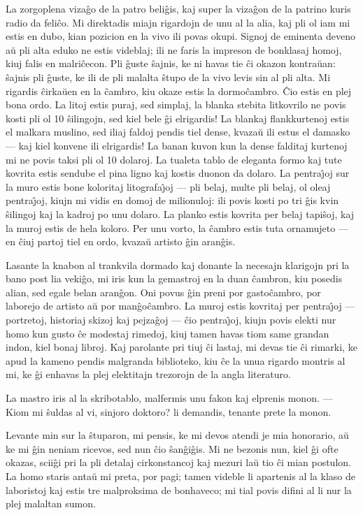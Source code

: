    La zorgoplena viza\^go de la patro beli\^gis, kaj super la viza\^gon
de la patrino kuris radio da feli\^co. Mi direktadis miajn rigardojn
de unu al la alia, kaj pli ol iam mi estis en dubo, kian pozicion en
la vivo ili povas okupi. Signoj de eminenta deveno a\u u pli alta
eduko ne estis videblaj; ili ne faris la impreson de bonklasaj
homoj, kiuj falis en malri\^cecon. Pli \^guste \^sajnis, ke ni havas
tie \^ci okazon kontra\u uan: \^sajnis pli \^guste, ke ili de pli
malalta \^stupo de la vivo levis sin al pli alta. Mi rigardis
\^cirka\u uen en la \^cambro, kiu okaze estis la dormo\^cambro.
\^Cio estis en plej bona ordo. La litoj estis puraj, sed simplaj, la
blanka stebita litkovrilo ne povis kosti pli ol 10 \^silingojn, sed
kiel bele \^gi elrigardis! La blankaj flankkurtenoj estis el malkara
muslino, sed iliaj faldoj pendis tiel dense, kvaza\u u ili estus el
damasko --- kaj kiel konvene ili elrigardis! La banan kuvon kun la
dense falditaj kurtenoj mi ne povis taksi pli ol 10 dolaroj. La
tualeta tablo de eleganta formo kaj tute kovrita estis sendube el
pina ligno kaj kostis duonon da dolaro. La pentra\^{\j}oj sur la
muro estis bone koloritaj litografa\^{\j}oj --- pli belaj, multe pli
belaj, ol oleaj pentra\^{\j}oj, kiujn mi vidis en domoj de
milionuloj: ili povis kosti po tri \^gis kvin \^silingoj kaj la
kadroj po unu dolaro. La planko estis kovrita per belaj tapi\^soj,
kaj la muroj estis de hela koloro. Per unu vorto, la \^cambro estis
tuta ornamujeto --- en \^ciuj partoj tiel en ordo, kvaza\u u artisto
\^gin aran\^gis.

   Lasante la knabon al trankvila dormado kaj donante la necesajn
klarigojn pri la bano post lia veki\^go, mi iris kun la gemastroj en
la duan \^cambron, kiu posedis alian, sed egale belan aran\^gon. Oni
povus \^gin preni por gasto\^cambro, por laborejo de artisto a\u u
por man\^go\^cambro. La muroj estis kovritaj per pentra\^{\j}oj ---
portretoj, historiaj skizoj kaj pejza\^goj --- \^cio pentra\^{\j}oj,
kiujn povis elekti nur homo kun gusto \^ce modestaj rimedoj, kiuj
tamen havas tiom same grandan indon, kiel bonaj libroj. Kaj
parolante pri tiuj \^ci lastaj, mi devas tie \^ci rimarki, ke apud
la kameno pendis malgranda biblioteko, kiu \^ce la unua rigardo
montris al mi, ke \^gi enhavas la plej elektitajn trezorojn de la
angla literaturo.

   La mastro iris al la skribotablo, malfermis unu fakon kaj elprenis
monon. --- Kiom mi \^suldas al vi, sinjoro doktoro? li demandis,
tenante prete la monon.

   Levante min sur la \^stuparon, mi pensis, ke mi devos atendi je mia
honorario, a\u u ke mi \^gin neniam ricevos, sed nun \^cio
\^san\^gi\^gis. Mi ne bezonis nun, kiel \^gi ofte okazas, scii\^gi
pri la pli detalaj cirkonstancoj kaj mezuri la\u u tio \^ci mian
postulon. La homo staris anta\u u mi preta, por pagi; tamen videble
li apartenis al la klaso de laboristoj kaj estis tre malproksima de
bonhaveco; mi tial povis difini al li nur la plej malaltan sumon.

